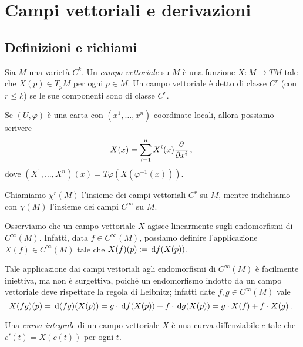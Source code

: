 \chapter{Campi vettoriali e derivazioni}

\section{Definizioni e richiami} %

\begin{definition} 
	Sia $M$ una varietà $C^k$. Un \emph{campo vettoriale} su $M$ è una funzione $X:M\to TM$ tale che $X(p)\in T_pM$ per ogni $p\in M$. Un campo vettoriale è detto di classe $C^r$ (con $r\le k$) se le sue componenti sono di classe $C^r$.
\end{definition}

Se $(U,\varphi)$ è una carta con $(x^1,\dots,x^n)$ coordinate locali, allora possiamo scrivere
\begin{equation*}
	X(x)=\sum_{i=1}^nX^i(x)\frac{\partial}{\partial x^i}\, \text{, }
\end{equation*}
dove $(X^1,\dots,X^n)(x)=T\varphi(X(\varphi^{-1}(x)))$.

 
Chiamiamo $\chi^r(M)$ l'insieme dei campi vettoriali $C^r$ su $M$, mentre indichiamo con $\chi(M)$ l'insieme dei campi $C^\infty$ su $M$.
 

\begin{remark} \label{nota:CampiVettEndomorfismiCinfinito}
	Osserviamo che un campo vettoriale $X$ agisce linearmente sugli endomorfismi di $C^\infty(M)$. Infatti, data $f\in C^\infty(M)$, possiamo definire l'applicazione $X(f)\in C^\infty(M)$ tale che $X(f)(p)\coloneqq \,\mathrm d f(X(p))$.
	
	Tale applicazione dai campi vettoriali agli endomorfismi di $C^\infty(M)$ è facilmente iniettiva, ma non è surgettiva, poiché un endomorfismo indotto da un campo vettoriale deve rispettare la regola di Leibnitz; infatti date $f,g \in C^\infty(M)$ vale
	\begin{equation*}
		X(fg) (p) = \,\mathrm d (f g) (X(p)) = g \cdot \,\mathrm d f (X(p)) + f \cdot \,\mathrm d g(X(p)) = g \cdot X(f) + f \cdot X(g) \, \text{. } 
	\end{equation*}

\end{remark}

 
\begin{definition} 
	Una \emph{curva integrale} di un campo vettoriale $X$ è una curva diffenziabile $c$ tale che $c'(t)=X(c(t))$ per ogni $t$.
\end{definition}

